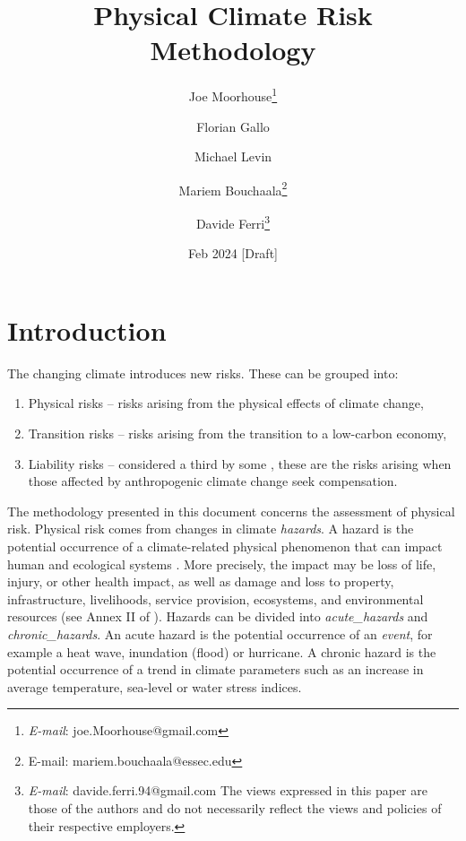 \documentclass[a4paper,11pt]{extarticle} %
\title{Physical Climate Risk Methodology}
\author{Joe Moorhouse\thanks{\textit{E-mail}: joe.Moorhouse@gmail.com}
        \and
        Florian Gallo
        \and
        Michael Levin
        \and
        Mariem Bouchaala\thanks{{E-mail}: mariem.bouchaala@essec.edu}
        \and
        Davide Ferri\thanks{\textit{E-mail}: davide.ferri.94@gmail.com
        \smallskip
        \newline%
    The views expressed in this paper are those of the authors and do not necessarily reflect the views and policies of their respective employers.}
    }
\date{Feb 2024 [Draft]}
\begin{document}

\maketitle{}



\clearpage
\setcounter{tocdepth}{4}
\renewcommand{\contentsname}{Contents}
\tableofcontents




\clearpage
\section{Introduction}
\label{Sec:Introduction}

The changing climate introduces new risks. These can be grouped into:
\begin{enumerate}
    \item Physical risks -- risks arising from the physical effects of climate change,
    \item Transition risks -- risks arising from the transition to a low-carbon economy,
    \item Liability risks -- considered a third by some \cite{WoetzelEtAl:2020}, these are the risks arising when those affected by anthropogenic climate change seek compensation.
\end{enumerate}


The methodology presented in this document concerns the assessment of physical risk. Physical risk comes from changes in climate \emph{\gls{hazard}s}. A hazard is the potential occurrence of a climate-related physical phenomenon that can impact human and ecological systems \cite{ReisingerEtAl:2020}\cite{WoetzelEtAl:2020}\cite{MitchellEtAl:2017}. More precisely, the impact may be loss of life, injury, or other
health impact, as well as damage and loss to property, infrastructure,
livelihoods, service provision, ecosystems, and environmental resources (see Annex II of \cite{PortnerEtAl:2022}). Hazards can be divided into \emph{\gls{acute_hazard}s} and \emph{\gls{chronic_hazard}s}. An acute hazard is the potential occurrence of an \emph{event}, for example a heat wave, inundation (flood) or hurricane. A chronic hazard is the potential occurrence of a trend in climate parameters such as an increase in average temperature, sea-level or water stress indices.
\end{document}
